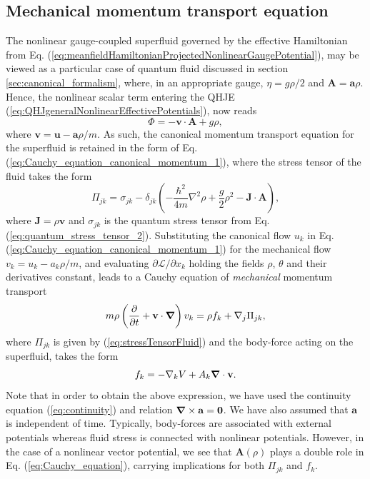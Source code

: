 \documentclass[twocolumn, nofootinbib, nobibnotes, amsmath,amssymb,aps, pra, floatfix]{revtex4-1}
\renewcommand{\v}[1]{\ensuremath{\mathbf{#1}}} %
\newcommand{\gv}[1]{\ensuremath{\mbox{\boldmath$ #1 $}}} %
\newcommand{\pd}[2]{\frac{\partial #1}{\partial #2}} %
\newcommand{\grad}[1]{\gv{\nabla} #1} %
\renewcommand{\div}[1]{\gv{\nabla} \cdot #1} %
\newcommand{\curl}[1]{\gv{\nabla} \times #1} %
\begin{document}
\subsection{Mechanical momentum transport equation}
The nonlinear gauge-coupled superfluid governed by the effective Hamiltonian from Eq. (\ref{eq:meanfieldHamiltonianProjectedNonlinearGaugePotential}), may be viewed as a particular case of quantum fluid discussed in section \ref{sec:canonical_formalism}, where, in an appropriate gauge, $\eta=g\rho/2$ and $\v{A}=\v{a}\rho$.
Hence, the nonlinear scalar term entering the QHJE (\ref{eq:QHJgeneralNonlinearEffectivePotentials}), now reads
\begin{equation}
  \Phi=-\v{v}\cdot\v{A}+g\rho,
  \label{eq:nonlinearPotentialQHJEDensityModulatedGaugePotential}
\end{equation}
where $\v{v}=\v{u}-\v{a}\rho/m$.
As such, the canonical momentum transport equation for the superfluid is retained in the form of Eq. (\ref{eq:Cauchy_equation_canonical_momentum_1}), where the stress tensor of the fluid takes the form 
\begin{equation}
  \Pi_{jk}=\sigma_{jk}-\delta_{jk}\left( -\frac{\hbar^2}{4m}\nabla^2\rho+\frac{g}{2}\rho^2-\v{J}\cdot\v{A} \right),
  \label{eq:stressTensorFluid}
\end{equation}
where $\v{J}=\rho\v{v}$ and $\sigma_{jk}$ is the quantum stress tensor from Eq. (\ref{eq:quantum_stress_tensor_2}).
Substituting the canonical flow $u_k$ in Eq. (\ref{eq:Cauchy_equation_canonical_momentum_1}) for the mechanical flow $v_k=u_k-a_k\rho/m$, and evaluating $\partial\mathcal{L}/\partial x_k$ holding the fields $\rho$, $\theta$ and their derivatives constant, leads to a Cauchy equation of \textit{mechanical} momentum transport
\begin{equation}
  m\rho \left( \pd{}{t}+\v{v}\cdot\grad{} \right)v_k=\rho f_k + \nabla_j \Pi_{jk},
  \label{eq:Cauchy_equation}
\end{equation}
where $\Pi_{jk}$ is given by (\ref{eq:stressTensorFluid}) and the body-force acting on the superfluid, takes the form
\begin{equation}
  f_k=-\nabla_kV+A_k\div{\v{v}}.
  \label{eq:body_forces_multi_component_gauge_potential}
\end{equation}
Note that in order to obtain the above expression, we have used the continuity equation (\ref{eq:continuity}) and relation $\curl{\v{a}}=\v{0}$.
We have also assumed that $\v{a}$ is independent of time.
Typically, body-forces are associated with external potentials whereas fluid stress is connected with nonlinear potentials.   
However, in the case of a nonlinear vector potential, we see that $\v{A}\left( \rho \right)$ plays a double role in Eq. (\ref{eq:Cauchy_equation}), carrying implications for both $\Pi_{jk}$ and $f_k$.
\end{document}
